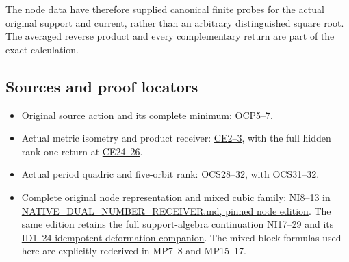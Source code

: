 \documentclass[10pt]{article}
\begin{document}
The node data have therefore supplied canonical finite probes for the actual original support and current, rather than an arbitrary distinguished square root. The averaged reverse product and every complementary return are part of the exact calculation.

\subsection{Sources and proof locators}\label{sources-and-proof-locators}

\begin{itemize}
\tightlist
\item
  Original source action and its complete minimum: \href{https://github.com/KokunoYumeto/zeta-function-research-reader/blob/5c69161ca70ee187f41df0bfe786e8b6eebed422/workbenches/splitzero-tandem/continuations/20260922-current-effective-cutoff/OBSERVED_CURRENT_PLANE.tex\#L90}{OCP5--7}.
\item
  Actual metric isometry and product receiver: \href{https://github.com/KokunoYumeto/zeta-function-research-reader/blob/5c69161ca70ee187f41df0bfe786e8b6eebed422/workbenches/splitzero-tandem/continuations/20260922-current-effective-cutoff/EVOLUTION_PROOF.md\#L18}{CE2--3}, with the full hidden rank-one return at \href{https://github.com/KokunoYumeto/zeta-function-research-reader/blob/5c69161ca70ee187f41df0bfe786e8b6eebed422/workbenches/splitzero-tandem/continuations/20260922-current-effective-cutoff/EVOLUTION_PROOF.md\#L255}{CE24--26}.
\item
  Actual period quadric and five-orbit rank: \href{https://github.com/KokunoYumeto/zeta-function-research-reader/blob/6cf5b3aa8ff395eba6b5512b28d117334da5767b/workbenches/splitzero-tandem/continuations/20260922-cutoff-profile/RETAINED_COMPLETE_PROOF_SOURCES.tex\#L10987}{OCS28--32}, with \href{https://github.com/KokunoYumeto/zeta-function-research-reader/blob/6cf5b3aa8ff395eba6b5512b28d117334da5767b/workbenches/splitzero-tandem/continuations/20260922-cutoff-profile/RETAINED_COMPLETE_PROOF_SOURCES.tex\#L11073}{OCS31--32}.
\item
  Complete original node representation and mixed cubic family: \href{https://github.com/KokunoYumeto/zeta-function-research-reader/blob/6af54ea3c8ef99127af327f3103e086c68d482c2/workbenches/splitzero-tandem/branches/identity-absorber-square/NATIVE_DUAL_NUMBER_RECEIVER.md}{NI8--13 in NATIVE\_DUAL\_NUMBER\_RECEIVER.md, pinned node edition}. The same edition retains the full support-algebra continuation NI17--29 and its \href{https://github.com/KokunoYumeto/zeta-function-research-reader/blob/6af54ea3c8ef99127af327f3103e086c68d482c2/workbenches/splitzero-tandem/branches/identity-absorber-square/IDEMPOTENT_DEFORMATION.md}{ID1--24 idempotent-deformation companion}. The mixed block formulas used here are explicitly rederived in MP7--8 and MP15--17.
\end{itemize}
\end{document}
